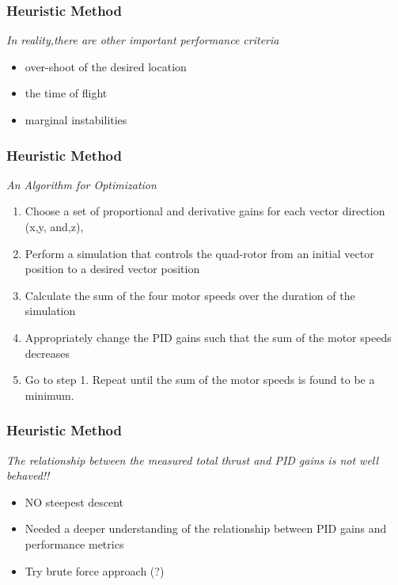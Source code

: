 \documentclass{beamer}
\begin{document}
\begin{frame}

\frametitle{Heuristic Method}

\textit{In reality,there are other important performance criteria}
\begin{itemize}
\item over-shoot of the desired location
\item the time of flight
\item marginal instabilities
\end{itemize}
\end{frame}






\begin{frame}
\frametitle{Heuristic Method}

\textit{An Algorithm for Optimization}
\begin{enumerate}
\item Choose a set of proportional and derivative gains for each vector direction (x,y, and,z),
\item Perform a simulation that controls the quad-rotor from an initial vector position to a desired vector position
\item Calculate the sum of the four motor speeds over the duration of the simulation
\item Appropriately change the PID gains such that the sum of the motor speeds decreases
\item Go to step 1. Repeat until the sum of the motor speeds is found to be a minimum.
\end{enumerate}
\end{frame}



\begin{frame}

\frametitle{Heuristic Method}

\textit{The relationship between the measured total thrust and PID gains is not well behaved!!}

\begin{itemize}
\item NO steepest descent
\item Needed a deeper understanding of the relationship between PID gains and performance metrics
\item Try brute force approach (?)
\end{itemize}
\end{frame}
\end{document}
